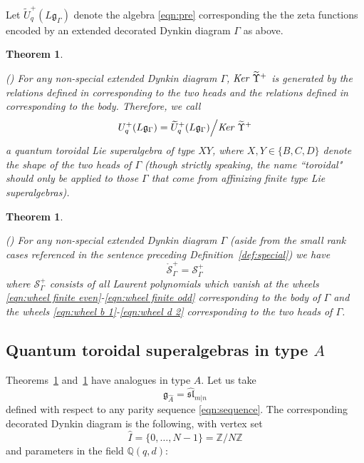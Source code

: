 \documentclass{amsart}
\newtheorem{theorem}[subsection]{Theorem}
\def\fg{{\mathfrak{g}}}
\def\fsl{{\mathfrak{sl}}}
\def\BQ{{\mathbb{Q}}}
\def\BZ{{\mathbb{Z}}}
\def\CS{{\mathcal{S}}}
\def\oCS{\mathring{\CS}}
\begin{document}
\medskip

\noindent Let $\widetilde{U}^+_q(L\fg_\Gamma)$ denote the algebra \eqref{eqn:pre} corresponding the the zeta functions encoded by an extended decorated Dynkin diagram $\Gamma$ as above.

\medskip

\begin{theorem}
\label{thm:toroidal b,c,d 1}
	
(\cite[Theorem 1.5]{NT}) For any non-special extended Dynkin diagram $\Gamma$, $\emph{Ker }\widetilde{\Upsilon}^+$ is generated by the relations defined in \cite{BFK,XZ} corresponding to the two heads and the relations defined in \cite{Y2} corresponding to the body. Therefore, we call
\[
U^+_q(L\fg_\Gamma) = \widetilde{U}^+_q(L\fg_\Gamma) \Big/ \emph{Ker }\widetilde{\Upsilon}^+
\]
a quantum toroidal Lie superalgebra of type $XY$, where $X,Y \in \{B,C,D\}$ denote the shape of the two heads of $\Gamma$ (though strictly speaking, the name ``toroidal" should only be applied to those $\Gamma$ that come from affinizing finite type Lie superalgebras).
	
\end{theorem}

\medskip

\begin{theorem}
\label{thm:toroidal b,c,d 2}

(\cite{NT}) For any non-special extended Dynkin diagram $\Gamma$ (aside from the small rank cases referenced in the sentence preceding Definition~\ref{def:special}) we have
\[
\oCS^+_{\Gamma} = \CS_{\Gamma}^+
\]
where $\CS^+_{\Gamma}$ consists of all Laurent polynomials which vanish at the wheels \eqref{eqn:wheel finite even}-\eqref{eqn:wheel finite odd} corresponding to the body of $\Gamma$ and the wheels \eqref{eqn:wheel b 1}-\eqref{eqn:wheel d 2} corresponding to the two heads of $\Gamma$.

\end{theorem}

\medskip 

\subsection{Quantum toroidal superalgebras in type $A$}
\label{sub:toroidal a}

Theorems~\ref{thm:toroidal b,c,d 1} and~\ref{thm:toroidal b,c,d 2} have analogues in type $A$. Let us take
\[
\fg_{\widehat{A}} = \widehat{\fsl}_{m|n}
\]
defined with respect to any parity sequence \eqref{eqn:sequence}. The corresponding decorated Dynkin diagram is the following, with vertex set 
\[
\widehat{I} = \{0,\dots,N-1\} = \BZ/N\BZ
\] 
and parameters in the field $\BQ(q,d)$:
\end{document}
